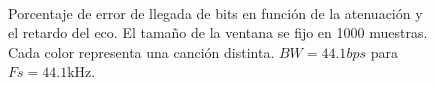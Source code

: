\documentclass[conference]{IEEEtran}
\begin{document}
\begin{figure}[h]
    \centering
\\

  \caption{Porcentaje de error de llegada de bits en función de la atenuación y el retardo del eco. El tamaño de la ventana se fijo en 1000 muestras. Cada color representa una canción distinta. $BW=44.1bps$ para $Fs=44.1$kHz.}
  \label{fig:1000} 
\end{figure}
\end{document}
